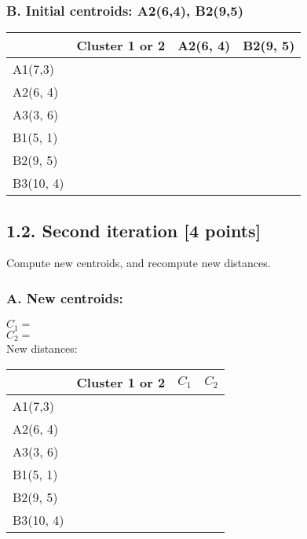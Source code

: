 \documentclass{article}
\begin{document}
\subsubsection*{B. Initial centroids: A2(6,4), B2(9,5)}
\label{T11B}
\begin{table}[h]
\begin{tabular}{|l|l|l|l|}
\hline
          & Cluster 1 or 2 & A2(6, 4) & B2(9, 5) \\ \hline
A1(7,3)   &                &          &          \\ \hline
A2(6, 4)  &                &          &          \\ \hline
A3(3, 6)  &                &          &          \\ \hline
B1(5, 1)  &                &          &          \\ \hline
B2(9, 5)  &                &          &          \\ \hline
B3(10, 4) &                &          &          \\ \hline
\end{tabular}
\end{table}
\label{T11B}


\newpage
\subsection*{1.2. Second iteration [4 points]}

Compute new centroids, and recompute new distances.

\subsubsection*{A. New centroids:}
$C_1=$ \\
$C_2=$ \\
New distances:

\begin{table}[h]
\label{T12A}
\begin{tabular}{|l|l|l|l|}
\hline
          & Cluster 1 or 2 & $C_1$ & $C_2$\\ \hline
A1(7,3)   &                &  &  \\ \hline
A2(6, 4)  &                &  &  \\ \hline
A3(3, 6)  &                &  &  \\ \hline
B1(5, 1)  &                &  &  \\ \hline
B2(9, 5)  &                &  &  \\ \hline
B3(10, 4) &                &  &  \\ \hline
\end{tabular}
\end{table}
\label{T12A}
\end{document}
